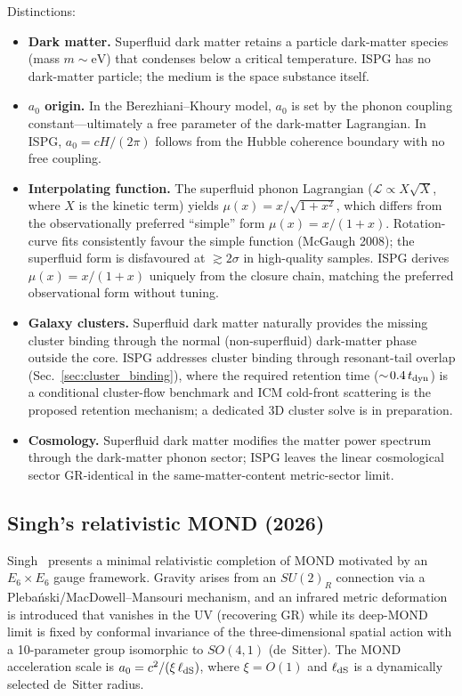 \documentclass[11pt]{article}
\begin{document}
Distinctions:
\begin{itemize}
  \item \textbf{Dark matter.}  Superfluid dark matter retains a
    particle dark-matter species (mass $m\sim\mathrm{eV}$) that
    condenses below a critical temperature.  ISPG has no dark-matter
    particle; the medium is the space substance itself.
  \item \textbf{$a_0$ origin.}  In the Berezhiani--Khoury model,
    $a_0$ is set by the phonon coupling constant---ultimately a free
    parameter of the dark-matter Lagrangian.  In ISPG, $a_0=cH/(2\pi)$
    follows from the Hubble coherence boundary with no free coupling.
  \item \textbf{Interpolating function.}  The superfluid phonon
    Lagrangian ($\mathcal{L}\propto X\sqrt{X}$, where $X$ is the
    kinetic term) yields $\mu(x)=x/\!\sqrt{1+x^2}$, which differs
    from the observationally preferred ``simple'' form
    $\mu(x)=x/(1+x)$.  Rotation-curve fits consistently favour the
    simple function (McGaugh 2008); the superfluid form is disfavoured
    at $\gtrsim 2\sigma$ in high-quality samples.  ISPG derives
    $\mu(x)=x/(1+x)$ uniquely from the closure chain, matching the
    preferred observational form without tuning.
  \item \textbf{Galaxy clusters.}  Superfluid dark matter naturally
    provides the missing cluster binding through the normal (non-superfluid)
    dark-matter phase outside the core.  ISPG addresses cluster
    binding through resonant-tail overlap
    (Sec.~\ref{sec:cluster_binding}), where the required retention
    time ($\sim\!0.4\,t_{\rm dyn}$) is a conditional cluster-flow
    benchmark and ICM cold-front scattering is the proposed
    retention mechanism; a dedicated 3D cluster solve is in
    preparation.
  \item \textbf{Cosmology.}  Superfluid dark matter modifies the
    matter power spectrum through the dark-matter phonon sector;
    ISPG leaves the linear cosmological sector GR-identical in the
    same-matter-content metric-sector limit.
\end{itemize}

\subsection{Singh's relativistic MOND (2026)}

Singh~\cite{Singh2026} presents a minimal relativistic completion
of MOND motivated by an $E_6\times E_6$ gauge framework.  Gravity
arises from an $SU(2)_R$ connection via a Pleba\'{n}ski/MacDowell--Mansouri
mechanism, and an infrared metric deformation is introduced that
vanishes in the UV (recovering GR) while its deep-MOND limit is
fixed by conformal invariance of the three-dimensional spatial
action with a 10-parameter group isomorphic to $SO(4,1)$ (de~Sitter).
The MOND acceleration scale is $a_0=c^2/(\xi\,\ell_{\rm dS})$,
where $\xi=O(1)$ and $\ell_{\rm dS}$ is a dynamically selected
de~Sitter radius.
\end{document}
